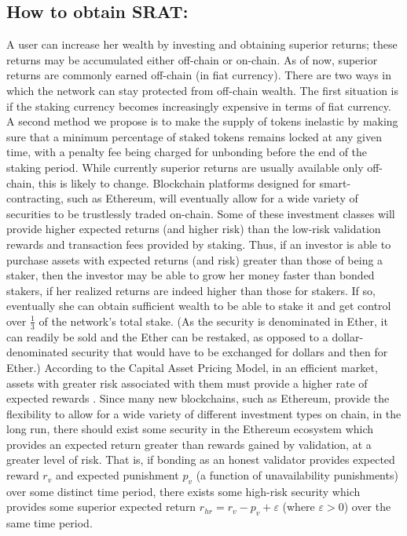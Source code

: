 \documentclass{article}
\renewcommand{\|}{\;|\;}
\begin{document}
\subsection{How to obtain SRAT:}
A user can increase her wealth by investing and obtaining superior returns; these  returns may be  accumulated either off-chain or on-chain. As of now, superior returns are commonly earned off-chain (in fiat currency). There are two ways in which the network can stay protected from off-chain wealth. The first situation is if the staking currency becomes increasingly expensive in terms of fiat currency. A second method we propose is to make the supply of tokens inelastic by making sure that a minimum percentage of staked tokens remains locked at any given time, with a penalty fee being charged for unbonding before the end of the staking period.\newline \newline
While currently superior returns are usually available only off-chain, this is likely to change. Blockchain platforms designed for smart-contracting, such as Ethereum, will eventually allow for a wide variety of securities to be trustlessly traded on-chain. Some of these investment classes will provide higher expected returns (and higher risk) than the low-risk validation rewards and transaction fees provided by staking. Thus, if an investor is able to purchase assets with expected returns (and risk) greater than those of being a staker, then the investor may be able to grow her money faster than bonded stakers, if her realized returns are indeed higher than those for stakers. If so, eventually she can obtain sufficient wealth to be able to stake it and get control over $\frac{1}{3}$ of the network's total stake. (As the security is denominated in Ether, it can readily be sold and the Ether can be restaked, as opposed to a dollar-denominated security that would have to be exchanged for dollars and then for Ether.) \newline \newline
According to the Capital Asset Pricing Model, in an efficient market, assets with greater risk associated with them must provide a higher rate of expected rewards \cite{sharpe1964}. Since many new blockchains, such as Ethereum, provide the flexibility to allow for a wide variety of different investment types on chain, in the long run, there should exist some security in the Ethereum ecosystem which provides an expected return greater than rewards gained by validation, at a greater level of risk. That is, if bonding as an honest validator provides expected reward $r_{v}$ and expected punishment $p_{v}$ (a function of unavailability punishments) over some distinct time period, there exists some high-risk security which provides some superior expected return $r_{hr} = r_{v} - p_{v} + \varepsilon$ (where $\varepsilon > 0$) over the same time period.\newline \newline
\end{document}
